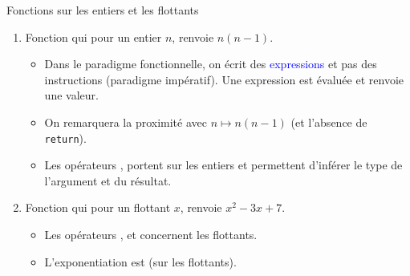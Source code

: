 \documentclass[10pt]{beamer}
\begin{document}
\begin{frame}{\Ctitle}{\stitle}
	\begin{exampleblock}{Fonctions sur les entiers et les flottants}
		\begin{enumerate}
			\item<1-> Fonction qui pour un entier $n$, renvoie $n(n-1)$.
				\begin{itemize}
					\item<2->{\textcolor{BrickRed}{\danger} Dans le paradigme fonctionnelle, on écrit des \textcolor{blue}{expressions} et pas des instructions (paradigme impératif). Une expression est évaluée et renvoie une valeur.}
					\item<3->{ On remarquera la proximité avec  $n \mapsto n(n-1)$ (et l'absence de {\tt return}).}
					\item<4->{ Les opérateurs \kw{*}, \kw{-} portent sur les entiers et permettent d'inférer le type de l'argument et du résultat.}
				\end{itemize}
			\item<4-> Fonction qui pour un flottant $x$, renvoie $x^2-3x+7$.
				\begin{itemize}
					\item<5-> Les opérateurs ,  et  concernent les flottants.
					\item<6-> L'exponentiation est \kw{**} (sur les flottants).
				\end{itemize}
		\end{enumerate}
	\end{exampleblock}
\end{frame}
\end{document}
